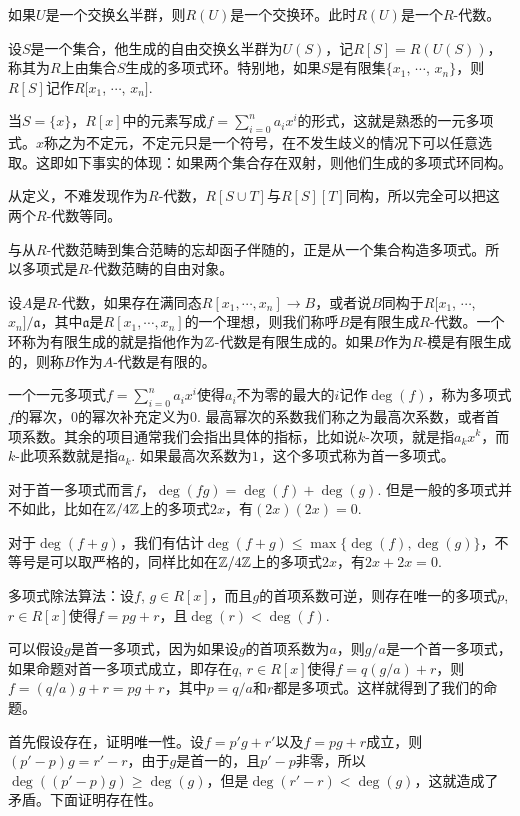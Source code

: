 如果$U$是一个交换幺半群，则$R(U)$是一个交换环。此时$R(U)$是一个$R$-代数。

\para 设$S$是一个集合，他生成的自由交换幺半群为$U(S)$，记$R[S]=R(U(S))$，称其为$R$上由集合$S$生成的多项式环。特别地，如果$S$是有限集$\{x_1$, $\cdots$, $x_n\}$，则$R[S]$记作$R[x_1$, $\cdots$, $x_n]$. 

当$S=\{x\}$，$R[x]$中的元素写成$f=\sum_{i=0}^na_ix^i$的形式，这就是熟悉的一元多项式。$x$称之为不定元，不定元只是一个符号，在不发生歧义的情况下可以任意选取。这即如下事实的体现：如果两个集合存在双射，则他们生成的多项式环同构。

从定义，不难发现作为$R$-代数，$R[S\cup T]$与$R[S][T]$同构，所以完全可以把这两个$R$-代数等同。

与从$R$-代数范畴到集合范畴的忘却函子伴随的，正是从一个集合构造多项式。所以多项式是$R$-代数范畴的自由对象。

\para 设$A$是$R$-代数，如果存在满同态$R[x_1,\cdots ,x_n]\to B$，或者说$B$同构于$R[x_1$, $\cdots$, $x_n]/\mathfrak{a}$，其中$\mathfrak{a}$是$R[x_1,\cdots ,x_n]$的一个理想，则我们称呼$B$是有限生成$R$-代数。一个环称为有限生成的就是指他作为$\mathbb{Z}$-代数是有限生成的。如果$B$作为$R$-模是有限生成的，则称$B$作为$A$-代数是有限的。

\para 一个一元多项式$f=\sum_{i=0}^na_ix^i$使得$a_i$不为零的最大的$i$记作$\deg(f)$，称为多项式$f$的幂次，$0$的幂次补充定义为$0$. 最高幂次的系数我们称之为最高次系数，或者首项系数。其余的项目通常我们会指出具体的指标，比如说$k$-次项，就是指$a_kx^k$，而$k$-此项系数就是指$a_k$. 如果最高次系数为$1$，这个多项式称为首一多项式。

对于首一多项式而言$f$，$\deg(fg)=\deg(f)+\deg(g)$. 但是一般的多项式并不如此，比如在$\mathbb{Z}/4\mathbb{Z}$上的多项式$2x$，有$(2x)(2x)=0$.

对于$\deg(f+g)$，我们有估计$\deg(f+g)\leq \max\{\deg(f),\deg(g)\}$，不等号是可以取严格的，同样比如在$\mathbb{Z}/4\mathbb{Z}$上的多项式$2x$，有$2x+2x=0$.

\theo 多项式除法算法：设$f$, $g\in R[x]$，而且$g$的首项系数可逆，则存在唯一的多项式$p$, $r\in R[x]$使得$f=pg+r$，且$\deg(r)<\deg(f)$.

\proof
	可以假设$g$是首一多项式，因为如果设$g$的首项系数为$a$，则$g/a$是一个首一多项式，如果命题对首一多项式成立，即存在$q$, $r\in R[x]$使得$f=q(g/a)+r$，则$f=(q/a)g+r=pg+r$，其中$p=q/a$和$r$都是多项式。这样就得到了我们的命题。

	首先假设存在，证明唯一性。设$f=p'g+r'$以及$f=pg+r$成立，则$(p'-p)g=r'-r$，由于$g$是首一的，且$p'-p$非零，所以$\deg((p'-p)g)\geq \deg(g)$，但是$\deg(r'-r)< \deg(g)$，这就造成了矛盾。下面证明存在性。

